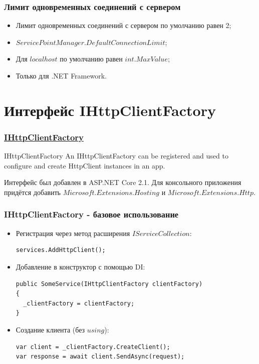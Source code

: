 \documentclass{beamer}
\begin{document}
\begin{frame}
\frametitle{Лимит одновременных соединений с сервером}
\begin{itemize}
	\item Лимит одновременных соединений с сервером по умолчанию равен 2;
	\item $ServicePointManager.DefaultConnectionLimit$;
	\item Для $localhost$ по умолчанию равен $int.MaxValue$;
	\item Только для .NET Framework.
\end{itemize}
\end{frame}

\section{Интерфейс IHttpClientFactory}
\begin{frame}
\frametitle{\href{https://docs.microsoft.com/en-us/dotnet/api/system.net.http.ihttpclientfactory?view=aspnetcore-2.2}{IHttpClientFactory}}
\begin{block}{IHttpClientFactory}
An IHttpClientFactory can be registered and used to configure and create HttpClient instances in an app.
\end{block}
Интерфейс был добавлен в ASP.NET Core 2.1.
\newline
\newline
Для консольного приложения придётся добавить \href{https://www.nuget.org/packages/Microsoft.Extensions.Hosting}{$Microsoft.Extensions.Hosting$} и \href{https://www.nuget.org/packages/Microsoft.Extensions.Http}{$Microsoft.Extensions.Http$}.
\end{frame}

\begin{frame}[fragile]
\frametitle{IHttpClientFactory - базовое использование}
\begin{itemize}
\item<1-> Регистрация через метод расширения $IServiceCollection$:
\begin{lstlisting}
services.AddHttpClient();
\end{lstlisting}
\item<2-> Добавление в конструктор с помощью DI:
\begin{lstlisting}
public SomeService(IHttpClientFactory clientFactory)
{
  _clientFactory = clientFactory;
}
\end{lstlisting}
\item<3-> Создание клиента (без $using$):
\begin{lstlisting}
var client = _clientFactory.CreateClient();
var response = await client.SendAsync(request);
\end{lstlisting}
\end{itemize}
\end{frame}
\end{document}
